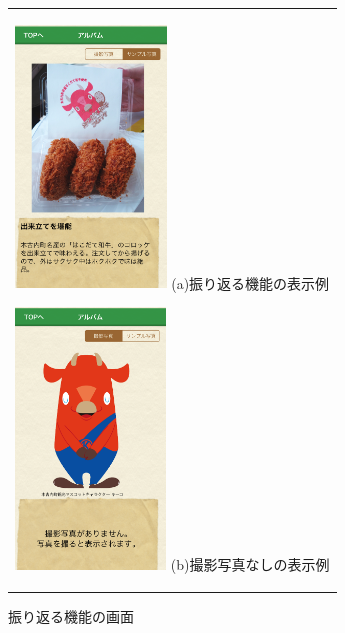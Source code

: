 \begin{figure}[htbp]
  \begin{center}
    \begin{tabular}{c}
    
      \begin{minipage}{0.33\hsize}
        \begin{center}
\includegraphics[width=4cm, bb=0 0 304 570]{album2.png}
          \hspace{1cm} (a)振り返る機能の表示例
        \end{center}
      \end{minipage}
      
      \begin{minipage}{0.33\hsize}
        \begin{center}
\includegraphics[width=4cm, bb=0 0 304 570]{album1.png}
          \hspace{1cm} (b)撮影写真なしの表示例
        \end{center}
      \end{minipage}

    \end{tabular}
    \caption{振り返る機能の画面}
    \label{fig:lena}
  \end{center}
\end{figure}　

